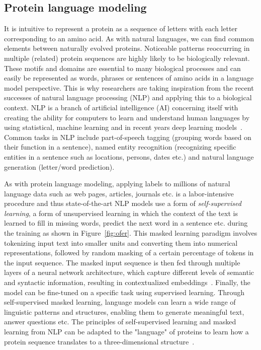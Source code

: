 \subsection*{Protein language modeling}\label{ssec:nlp}
It is intuitive to represent a protein as a sequence of letters with each letter corresponding to an amino acid. As with natural languages, we can find common elements between naturally evolved proteins. Noticeable patterns reoccurring in multiple (related) protein sequences are highly likely to be biologically relevant. These motifs and domains are essential to many biological processes and can easily be represented as words, phrases or sentences of amino acids in a language model perspective. This is why researchers are taking inspiration from the recent successes of natural language processing (NLP) and applying this to a biological context. NLP is a branch of artificial intelligence (AI) concerning itself with creating the ability for computers to learn and understand human languages by using statistical, machine learning and in recent years deep learning models~\cite{Ofer}. Common tasks in NLP include part-of-speech tagging (grouping words based on their function in a sentence), named entity recognition (recognizing specific entities in a sentence such as locations, persons, dates etc.) and natural language generation (letter/word prediction).

As with protein language modeling, applying labels to millions of natural language data such as web pages, articles, journals etc. is a labor-intensive procedure and thus state-of-the-art NLP models use a form of \textit{self-supervised learning}, a form of unsupervised learning in which the context of the text is learned to fill in missing words, predict the next word in a sentence etc. during the training as shown in Figure~\ref{fig:ofer}. This masked learning paradigm involves tokenizing input text into smaller units and converting them into numerical representations, followed by random masking of a certain percentage of tokens in the input sequence. The masked input sequence is then fed through multiple layers of a neural network architecture, which capture different levels of semantic and syntactic information, resulting in contextualized embeddings~\cite{esm}. Finally, the model can be fine-tuned on a specific task using supervised learning. Through self-supervised masked learning, language models can learn a wide range of linguistic patterns and structures, enabling them to generate meaningful text, answer questions etc. The principles of self-supervised learning and masked learning from NLP can be adapted to the "language" of proteins to learn how a protein sequence translates to a three-dimensional structure~\cite{review}.

